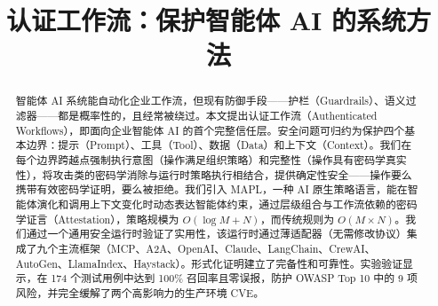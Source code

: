 \documentclass[conference,compsoc]{IEEEtran}
\begin{document}
\title{认证工作流：保护智能体 AI 的系统方法}

\author{
\and
{}
}

\maketitle

\begin{abstract}
智能体 AI 系统能自动化企业工作流，但现有防御手段——护栏（Guardrails）、语义过滤器——都是概率性的，且经常被绕过。本文提出认证工作流（Authenticated Workflows），即面向企业智能体 AI 的首个完整信任层。安全问题可归约为保护四个基本边界：提示（Prompt）、工具（Tool）、数据（Data）和上下文（Context）。我们在每个边界跨越点强制执行意图（操作满足组织策略）和完整性（操作具有密码学真实性），将攻击类的密码学消除与运行时策略执行相结合，提供确定性安全——操作要么携带有效密码学证明，要么被拒绝。我们引入 MAPL，一种 AI 原生策略语言，能在智能体演化和调用上下文变化时动态表达智能体约束，通过层级组合与工作流依赖的密码学证言（Attestation），策略规模为 $O(\log M + N)$，而传统规则为 $O(M \times N)$。我们通过一个通用安全运行时验证了实用性，该运行时通过薄适配器（无需修改协议）集成了九个主流框架（MCP、A2A、OpenAI、Claude、LangChain、CrewAI、AutoGen、LlamaIndex、Haystack）。形式化证明建立了完备性和可靠性。实验验证显示，在 174 个测试用例中达到 100\% 召回率且零误报，防护 OWASP Top 10 中的 9 项风险，并完全缓解了两个高影响力的生产环境 CVE。
\end{abstract}












\end{document}
